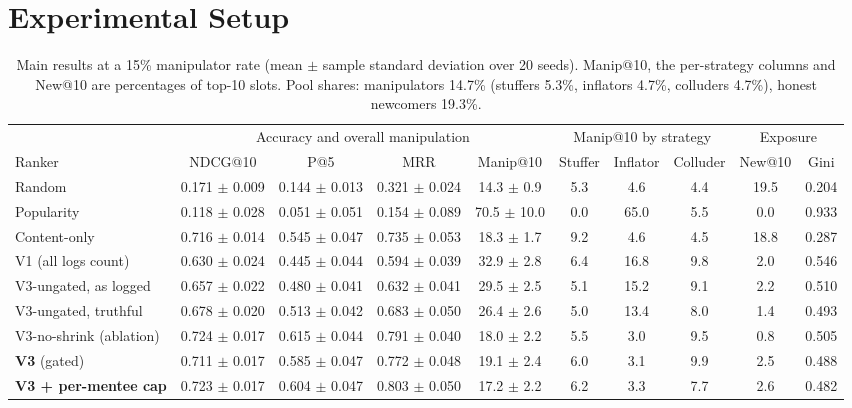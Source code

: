 \documentclass[conference]{IEEEtran}
\begin{document}
\section{Experimental Setup}
\label{sec:setup}

\begin{table}[t]
\centering
\caption{Main results at a 15\% manipulator rate (mean $\pm$ sample standard deviation over 20 seeds). Manip@10, the per-strategy columns and New@10 are percentages of top-10 slots. Pool shares: manipulators 14.7\% (stuffers 5.3\%, inflators 4.7\%, colluders 4.7\%), honest newcomers 19.3\%.}
\label{tab:main}
\footnotesize
\setlength{\tabcolsep}{4pt}
\renewcommand{\arraystretch}{1.12}
\begin{tabular}{lcccc ccc cc}
\toprule
 & \multicolumn{4}{c}{Accuracy and overall manipulation} & \multicolumn{3}{c}{Manip@10 by strategy} & \multicolumn{2}{c}{Exposure} \\
\cmidrule(lr){2-5}\cmidrule(lr){6-8}\cmidrule(lr){9-10}
Ranker & NDCG@10 & P@5 & MRR & Manip@10 & Stuffer & Inflator & Colluder & New@10 & Gini \\
\midrule
Random & 0.171 $\pm$ 0.009 & 0.144 $\pm$ 0.013 & 0.321 $\pm$ 0.024 & 14.3 $\pm$ 0.9 & 5.3 & 4.6 & 4.4 & 19.5 & 0.204 \\
Popularity & 0.118 $\pm$ 0.028 & 0.051 $\pm$ 0.051 & 0.154 $\pm$ 0.089 & 70.5 $\pm$ 10.0 & 0.0 & 65.0 & 5.5 & 0.0 & 0.933 \\
Content-only & 0.716 $\pm$ 0.014 & 0.545 $\pm$ 0.047 & 0.735 $\pm$ 0.053 & 18.3 $\pm$ 1.7 & 9.2 & 4.6 & 4.5 & 18.8 & 0.287 \\
\midrule
V1 (all logs count) & 0.630 $\pm$ 0.024 & 0.445 $\pm$ 0.044 & 0.594 $\pm$ 0.039 & 32.9 $\pm$ 2.8 & 6.4 & 16.8 & 9.8 & 2.0 & 0.546 \\
V3-ungated, as logged & 0.657 $\pm$ 0.022 & 0.480 $\pm$ 0.041 & 0.632 $\pm$ 0.041 & 29.5 $\pm$ 2.5 & 5.1 & 15.2 & 9.1 & 2.2 & 0.510 \\
V3-ungated, truthful & 0.678 $\pm$ 0.020 & 0.513 $\pm$ 0.042 & 0.683 $\pm$ 0.050 & 26.4 $\pm$ 2.6 & 5.0 & 13.4 & 8.0 & 1.4 & 0.493 \\
V3-no-shrink (ablation) & 0.724 $\pm$ 0.017 & 0.615 $\pm$ 0.044 & 0.791 $\pm$ 0.040 & 18.0 $\pm$ 2.2 & 5.5 & 3.0 & 9.5 & 0.8 & 0.505 \\
\textbf{V3} (gated) & 0.711 $\pm$ 0.017 & 0.585 $\pm$ 0.047 & 0.772 $\pm$ 0.048 & 19.1 $\pm$ 2.4 & 6.0 & 3.1 & 9.9 & 2.5 & 0.488 \\
\textbf{V3 + per-mentee cap} & 0.723 $\pm$ 0.017 & 0.604 $\pm$ 0.047 & 0.803 $\pm$ 0.050 & 17.2 $\pm$ 2.2 & 6.2 & 3.3 & 7.7 & 2.6 & 0.482 \\
\bottomrule
\end{tabular}
\end{table}
\end{document}
